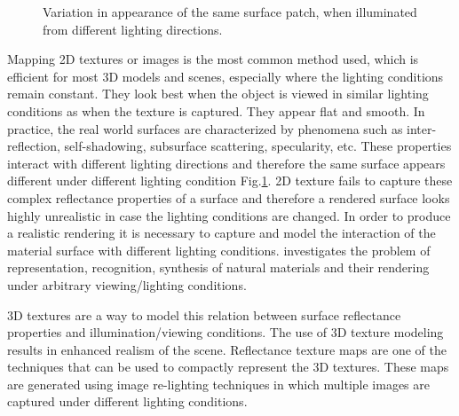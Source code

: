 \begin{figure}[t]
\centering
{}
\caption{Variation in appearance of the same surface
patch, when illuminated from different lighting directions.}
\label{fig:figure1}
\end{figure}
Mapping 2D textures or images is the most common method used, which is
efficient for most 3D models and scenes, especially where the lighting
conditions remain constant. They look best when the object is viewed in similar lighting conditions as
when the texture is captured. They appear flat and smooth.
In practice, the real world surfaces are
characterized by phenomena such as inter-reflection, self-shadowing, subsurface
scattering, specularity, etc. These properties interact with different lighting
directions and therefore the same surface appears different under
different lighting condition Fig.\ref{fig:figure1}. 2D texture fails to capture these complex reflectance properties of a 
surface and therefore a rendered surface looks highly unrealistic in case the lighting
conditions are changed. In order to produce a realistic rendering it is necessary to capture
and model the interaction of the material surface with different lighting
conditions. \cite{C1} investigates the problem of representation, recognition, synthesis of
natural materials and their rendering under arbitrary viewing/lighting conditions.





3D textures are a way to model this relation between surface reflectance
properties and illumination/viewing conditions.
The use of 3D texture modeling
results in enhanced realism of the scene. Reflectance texture maps are one of
the techniques that can be used to compactly represent the 3D textures. These
maps are generated using image re-lighting techniques \cite{C5,C4,C2} in which
multiple images are captured under different lighting conditions.

